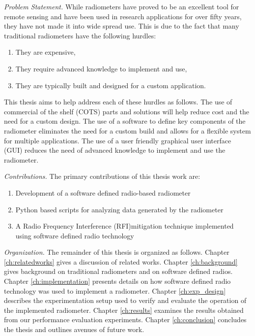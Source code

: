 \emph{Problem Statement.}  While radiometers have proved to be an excellent tool for remote sensing and have been used in research applications for over fifty years, they have not made it into wide spread use.  This is due to the fact that many traditional radiometers have the following hurdles:

\begin{enumerate}
\item They are expensive,
\item They require advanced knowledge to implement and use,
\item They are typically built and designed for a custom application.
\end{enumerate}

This thesis aims to help address each of these hurdles as follows.  The use of commercial of the shelf (COTS) parts and solutions will help reduce cost and the need for a custom design.  The use of a software to define key components of the radiometer eliminates the need for a custom build and allows for a flexible system for multiple applications.  The use of a user friendly graphical user interface (GUI) reduces the need of advanced knowledge to implement and use the radiometer. 


\emph{Contributions.}  The primary contributions of this thesis work are:

\begin{enumerate}
\item Development of a software defined radio-based radiometer
\item Python based scripts for analyzing data generated by the radiometer
\item A Radio Frequency Interference (RFI)mitigation technique implemented using software defined radio technology
\end{enumerate}

\emph{Organization.}  The remainder of this thesis is organized as follows.  Chapter \ref{ch:relatedworks} gives a discussion of related works.  Chapter \ref{ch:background} gives background on traditional radiometers and on software defined radios.  Chapter \ref{ch:implementation} presents details on how software defined radio technology was used to implement a radiometer.  Chapter \ref{ch:exp_design} describes the experimentation setup used to verify and evaluate the operation of the implemented radiometer.  Chapter \ref{ch:results} examines the results obtained from our performance evaluation experiments.  Chapter \ref{ch:conclusion} concludes the thesis and outlines avenues of future work.

